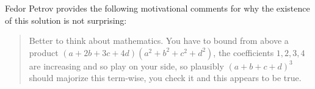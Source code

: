 \begin{remark*}
  Fedor Petrov provides the following motivational comments
  for why the existence of this solution is not surprising:
  \begin{quote}
    Better to think about mathematics.
    You have to bound from above a product $(a+2b+3c+4d)(a^2+b^2+c^2+d^2)$,
    the coefficients $1,2,3,4$ are increasing and so play on your side,
    so plausibly $(a+b+c+d)^3$ should majorize this term-wise,
    you check it and this appears to be true.
  \end{quote}
\end{remark*}
\pagebreak